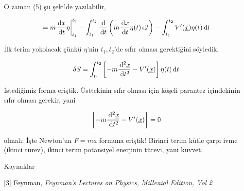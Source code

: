 \documentclass[12pt,fleqn]{article}\usepackage{../../common}
\begin{document}
O zaman (5) şu şekilde yazılabilir,

$$ 
= m \frac{\,\mathrm{d} \underline{x}}{\,\mathrm{d} t} \eta \bigg\vert_{t_1}^{t_2} 
- \int_{t_1}^{t_2} \frac{\,\mathrm{d}}{\,\mathrm{d} t} \left( m \frac{\,\mathrm{d} \underline{x}}{\,\mathrm{d} t} \eta(t) \,\mathrm{d} t\right)
- \int_{t_1}^{t_2} V'(\underline{x}) \eta(t) \,\mathrm{d} t
$$

İlk terim yokolacak çünkü $\eta$'nin $t_1,t_2$'de sıfır olması gerektiğini söyledik,

$$ 
\delta S = 
\int_{t_1}^{t_2} \left[ 
-m \frac{\,\mathrm{d}^2 \underline{x}}{\,\mathrm{d} t^2} - V'(\underline{x})
\right] 
\eta(t) \,\mathrm{d} t
$$

İstediğimiz forma eriştik. Üsttekinin sıfır olması için köşeli parantez
içindekinin sıfır olması gerekir, yani

$$ 
\left[ 
-m \frac{\,\mathrm{d}^2 \underline{x}}{\,\mathrm{d} t^2} - V'(\underline{x})
\right]  = 0
$$

olmalı. İşte Newton'un $F = ma$ formuna eriştik! Birinci terim kütle çarpı
ivme (ikinci türev), ikinci terim potansiyel enerjinin türevi, yani kuvvet.

Kaynaklar 

[3] Feynman, {\em Feynman's Lectures on Physics, Millenial Edition, Vol 2} 
\end{document}
